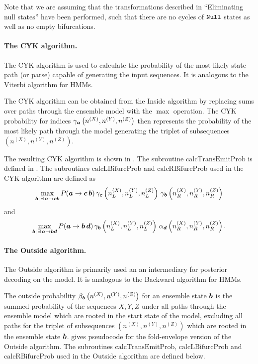 \documentclass[10pt]{article}
\begin{document}
Note that we are assuming that the transformations described in ``Eliminating null states'' have been performed, such that there are no cycles of $\mathtt{Null}$ states as well as no empty bifurcations.


\paragraph{The CYK algorithm.}
The CYK algorithm is used to calculate the probability of the
most-likely state path (or parse) capable of generating the input
sequences.  It is analogous to the Viterbi algorithm for HMMs.

The CYK algorithm can be obtained from the Inside algorithm by replacing sums over paths through the ensemble model
with the $\max$ operation.
The CYK probability for indices $\gamma_{\boldsymbol{a}} \left(n^{(X)}, n^{(Y)}, n^{(Z)}\right)$ then represents
the probability of the most likely path through the model generating 
the triplet of subsequences $\left( n^{(X)}, n^{(Y)}, n^{(Z)} \right)$.

The resulting CYK algorithm is shown in .
The subroutine $\mathrm{calcTransEmitProb}$ is defined in .  The subroutines $\mathrm{calcLBifurcProb}$ and $\mathrm{calcRBifurcProb}$
used in the CYK algorithm are defined as 
\[ \max_{\boldsymbol{b}|\,\exists\, \boldsymbol{a}\to\boldsymbol{c}\boldsymbol{b}} P (\boldsymbol{a}\to\boldsymbol{c}\,\boldsymbol{b}) \, \gamma_{\boldsymbol{c}}\left( n^{(X)}_L,n^{(Y)}_L,n^{(Z)}_L\right) \, \gamma_{\boldsymbol{b}}\left( n^{(X)}_R,n^{(Y)}_R,n^{(Z)}_R\right) \]
and
\[ \max_{\boldsymbol{b}|\,\exists\, \boldsymbol{a}\to\boldsymbol{b}\boldsymbol{d}} P (\boldsymbol{a}\to\boldsymbol{b}\,\boldsymbol{d}) \, \gamma_{\boldsymbol{b}}\left( n^{(X)}_L,n^{(Y)}_L,n^{(Z)}_L\right) \, \alpha_{\boldsymbol{d}}\left( n^{(X)}_R,n^{(Y)}_R,n^{(Z)}_R\right) . \]


\paragraph{The Outside algorithm.}
The Outside algorithm is primarily used an an intermediary for posterior decoding on the model.  It is analogous to the Backward algorithm for HMMs.

The outside probability $\beta_{\boldsymbol{b}} \left( n^{(X)}, n^{(Y)}, n^{(Z)}\right)$ for an ensemble state $\boldsymbol{b}$
is the summed probability of the sequences $X, Y, Z$
under all paths through the ensemble model which are rooted in the start state of the model, excluding all paths for the triplet of subsequences $\left( n^{(X)}, n^{(Y)}, n^{(Z)} \right)$
which are rooted in the ensemble state $\boldsymbol{b}$.
 gives pseudocode for the fold-envelope version of the Outside algorithm.
The subroutines $\mathrm{calcTransEmitProb}$, $\mathrm{calcLBifurcProb}$ and $\mathrm{calcRBifurcProb}$
used in the Outside algorithm are defined below.
\end{document}
